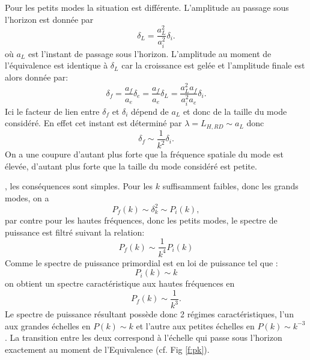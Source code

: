 Pour les petits modes la situation est différente. L'amplitude au passage sous l'horizon est donnée par
\begin{equation}
\delta_L=\frac{a_L^2}{a_i^2}\delta_i.
\end{equation}
où $a_L$ est l'instant de passage sous l'horizon. L'amplitude au moment de l'équivalence est identique à $\delta_L$ car la croissance est gelée et l'amplitude finale est alors donnée par:
\begin{equation}
\delta_f=\frac{a_f}{a_e}\delta_e=\frac{a_f}{a_e}\delta_L=\frac{a_L^2 a_f}{a_i^2 a_e}\delta_i.
\end{equation}
Ici le facteur de lien entre $\delta_f$ et $\delta_i$ dépend de $a_L$ et donc de la taille du mode considéré. En effet cet instant est déterminé par $\lambda = L_{H,RD} \sim a_L$ donc 
\begin{equation}
\delta_f \sim \frac{1}{k^2} \delta_i.
\end{equation}
On a une coupure d'autant plus forte que la fréquence spatiale du mode est élevée, d'autant plus forte que la taille du mode considéré est petite.

, les conséquences sont simples. Pour les $k$ suffisamment faibles, donc les grands modes, on a 
\begin{equation}
P_f(k)\sim\delta_k^2 \sim P_i(k),
\end{equation}
par contre pour les hautes fréquences, donc les petits modes, le spectre de puissance est filtré suivant la relation:
\begin{equation}
P_f(k)\sim \frac{1}{k^4} P_i(k)
\end{equation}
Comme le spectre de puissance primordial est en loi de puissance tel que :
\begin{equation}
P_i(k)\sim k
\end{equation}
on obtient un spectre caractéristique aux hautes fréquences en 
\begin{equation}
P_f(k)\sim\frac{1}{k^3}.
\end{equation}
Le spectre de puissance résultant possède donc 2 régimes caractéristiques, l'un aux grandes échelles en $P(k)\sim k$ et l'autre aux petites échelles en $P(k)\sim k^{-3}$. La transition entre les deux correspond à l'échelle qui passe sous l'horizon exactement au moment de l'Equivalence (cf. Fig \ref{f:pk}).

